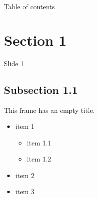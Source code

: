 \documentclass{beamer}
\title{\tlap}
\subtitle{%
    A modeling language for
    \texorpdfstring{\linebreak}{}%
    concurrent and distributed systems
}
\author{M. DONADONI \and A. FULGINI \and E. MORASSUTTO}
\begin{document}
    \begin{frame}
        \maketitle
    \end{frame}

    \begin{frame}{Table of contents}
      \tableofcontents
    \end{frame}

    \section[image=bgphoto_cut]{Section 1}
    \begin{frame}[plain]{}
        \sectionpage
    \end{frame}

    \begin{frame}{Slide 1}
        \lipsum[1]
    \end{frame}

    \subsection{Subsection 1.1}
    \begin{frame}[plain]{}
        \subsectionpage
    \end{frame}
    \begin{frame}
        This frame has an empty title.
        \vfill
        \begin{itemize}
            \item item 1
            \begin{itemize}
                \item item 1.1
                \item item 1.2
            \end{itemize}
            \item item 2
            \item item 3
        \end{itemize}
    \end{frame}
\end{document}
